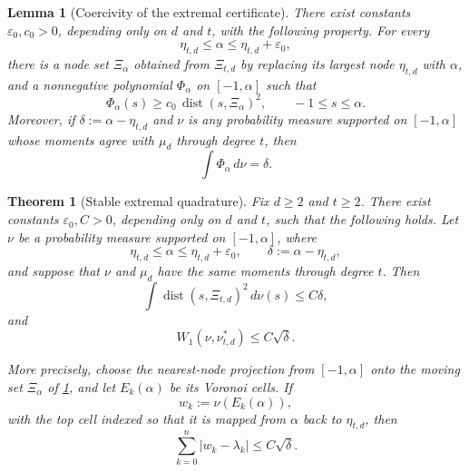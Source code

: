 \documentclass[10pt,a4paper]{amsart}
\newtheorem{lemma}{Lemma}
\newtheorem{theorem}{Theorem}
\begin{document}
\begin{lemma}[Coercivity of the extremal certificate]\label{lem:certificate-coercive}
There exist constants $\varepsilon_0,c_0>0$, depending only on $d$ and $t$, with the following property.  For every
\[
 \eta_{t,d}\le\alpha\le\eta_{t,d}+\varepsilon_0,
\]
there is a node set $\Xi_\alpha$ obtained from $\Xi_{t,d}$ by replacing its largest node $\eta_{t,d}$ with $\alpha$, and a nonnegative polynomial $\Phi_\alpha$ on $[-1,\alpha]$ such that
\begin{equation}\label{eq:certificate-coercive}
 \Phi_\alpha(s)\ge c_0\,\operatorname{dist}(s,\Xi_\alpha)^2,
 \qquad -1\le s\le\alpha.
\end{equation}
Moreover, if $\delta:=\alpha-\eta_{t,d}$ and $\nu$ is any probability measure supported on $[-1,\alpha]$ whose moments agree with $\mu_d$ through degree $t$, then
\begin{equation}\label{eq:certificate-defect}
 \int\Phi_\alpha\,d\nu=\delta.
\end{equation}
\end{lemma}

\begin{theorem}[Stable extremal quadrature]\label{thm:stable-quadrature}
Fix $d\ge2$ and $t\ge2$.  There exist constants $\varepsilon_0,C>0$, depending only on $d$ and $t$, such that the following holds.  Let $\nu$ be a probability measure supported on $[-1,\alpha]$, where
\[
 \eta_{t,d}\le\alpha\le\eta_{t,d}+\varepsilon_0,
 \qquad
 \delta:=\alpha-\eta_{t,d},
\]
and suppose that $\nu$ and $\mu_d$ have the same moments through degree $t$.  Then
\begin{equation}\label{eq:mean-square-clustering}
 \boxed{
 \int \operatorname{dist}(s,\Xi_{t,d})^2\,d\nu(s)
 \le C\delta,}
\end{equation}
and
\begin{equation}\label{eq:W1-stable}
 \boxed{
 W_1(\nu,\nu_{t,d}^*)\le C\sqrt\delta.}
\end{equation}

More precisely, choose the nearest-node projection from $[-1,\alpha]$ onto the moving set $\Xi_\alpha$ of \cref{lem:certificate-coercive}, and let $E_k(\alpha)$ be its Voronoi cells.  If
\[
 w_k:=\nu(E_k(\alpha)),
\]
with the top cell indexed so that it is mapped from $\alpha$ back to $\eta_{t,d}$, then
\begin{equation}\label{eq:weight-stability}
 \boxed{
 \sum_{k=0}^n|w_k-\lambda_k|\le C\sqrt\delta.}
\end{equation}
\end{theorem}
\end{document}
